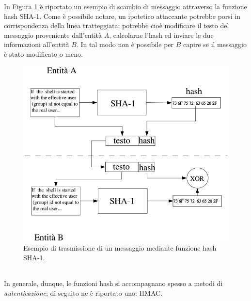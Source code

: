 In Figura \ref{img:SHA_example} è riportato un esempio di scambio di messaggio attraverso la funzione hash SHA-1. Come è possibile notare, un ipotetico attaccante potrebbe porsi in corrispondenza della linea tratteggiata; potrebbe cioè modificare il testo del messaggio proveniente dall'entità $A$, calcolarne l'hash ed inviare le due informazioni all'entità $B$. In tal modo non è possibile per $B$ capire se il messaggio è stato modificato o meno.
\begin{figure}[htbp]
	\centering
	\includegraphics[scale = 0.5]{images/SHA_example}
	\caption{Esempio di trasmissione di un messaggio mediante funzione hash SHA-1.}
	\label{img:SHA_example}
\end{figure}\\
In generale, dunque, le funzioni hash si accompagnano spesso a metodi di \textit{autenticazione}; di seguito ne è riportato uno: HMAC. 


